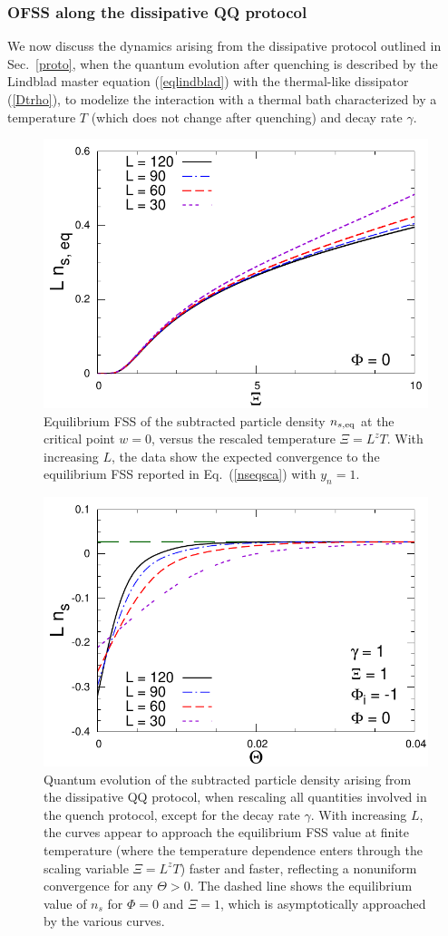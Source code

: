 \subsubsection{OFSS along the dissipative QQ protocol}
\label{scalprotb}

We now discuss the dynamics arising from the dissipative protocol
outlined in Sec.~\ref{proto}, when the quantum evolution after
quenching is described by the Lindblad master equation
(\ref{eqlindblad}) with the thermal-like dissipator (\ref{Dtrho}), to
modelize the interaction with a thermal bath characterized by a
temperature $T$ (which does not change after quenching)
and decay rate $\gamma$.

\begin{figure}[!htb]
\centering
  \includegraphics[width=0.6\columnwidth]{imm/LNeqXik0.pdf}
  \caption{ Equilibrium FSS of the subtracted particle density
    $n_{s,{\rm eq}}$ at the critical point $w=0$, versus the rescaled
    temperature $\Xi=L^z T$. With increasing $L$, the data show the
    expected convergence to the equilibrium FSS reported in
    Eq.~(\ref{nseqsca}) with $y_n=1$. }
  \label{eqns}
\end{figure}

  
\begin{figure}[!htb]
\centering
  \includegraphics[width=0.6\columnwidth]{imm/LNk-1q0e100t100g1000.pdf}
  \caption{Quantum evolution of the subtracted particle density
    arising from the dissipative QQ protocol, when rescaling all
    quantities involved in the quench protocol, except for the decay
    rate $\gamma$. With increasing $L$, the curves appear to approach
    the equilibrium FSS value at finite temperature (where the
    temperature dependence enters through the scaling variable
    $\Xi=L^z T$) faster and faster, reflecting a nonuniform
    convergence for any $\Theta>0$. The dashed line shows the
    equilibrium value of $n_s$ for $\Phi=0$ and $\Xi=1$, which is
    asymptotically approached by the various curves.  }
  \label{protbresgamma}
\end{figure}



